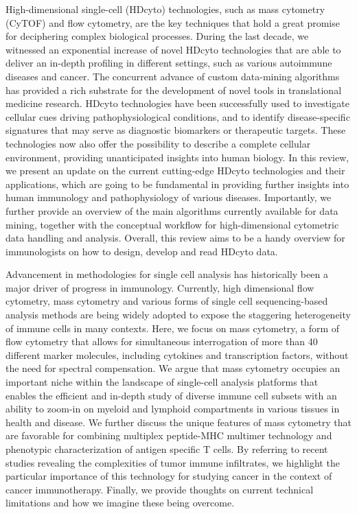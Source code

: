 \cite{galliEndOmicsHigh2019}
High-dimensional single-cell (HDcyto) technologies, such as mass cytometry
(CyTOF) and flow cytometry, are the key techniques that hold a great promise
for deciphering complex biological processes. During the last decade, we
witnessed an exponential increase of novel HDcyto technologies that are able to
deliver an in-depth profiling in different settings, such as various autoimmune
diseases and cancer. The concurrent advance of custom data-mining algorithms
has provided a rich substrate for the development of novel tools in
translational medicine research. HDcyto technologies have been successfully
used to investigate cellular cues driving pathophysiological conditions, and to
identify disease-specific signatures that may serve as diagnostic biomarkers or
therapeutic targets. These technologies now also offer the possibility to
describe a complete cellular environment, providing unanticipated insights into
human biology. In this review, we present an update on the current cutting-edge
HDcyto technologies and their applications, which are going to be fundamental
in providing further insights into human immunology and pathophysiology of
various diseases. Importantly, we further provide an overview of the main
algorithms currently available for data mining, together with the conceptual
workflow for high-dimensional cytometric data handling and analysis. Overall,
this review aims to be a handy overview for immunologists on how to design,
develop and read HDcyto data.

\cite{simoniMassCytometryPowerful2018}
Advancement in methodologies for single cell analysis has historically been a
major driver of progress in immunology. Currently, high dimensional flow
cytometry, mass cytometry and various forms of single cell sequencing-based
analysis methods are being widely adopted to expose the staggering
heterogeneity of immune cells in many contexts. Here, we focus on mass
cytometry, a form of flow cytometry that allows for simultaneous interrogation
of more than 40 different marker molecules, including cytokines and
transcription factors, without the need for spectral compensation. We argue
that mass cytometry occupies an important niche within the landscape of
single-cell analysis platforms that enables the efficient and in-depth study of
diverse immune cell subsets with an ability to zoom-in on myeloid and lymphoid
compartments in various tissues in health and disease. We further discuss the
unique features of mass cytometry that are favorable for combining multiplex
peptide-MHC multimer technology and phenotypic characterization of antigen
specific T cells. By referring to recent studies revealing the complexities of
tumor immune infiltrates, we highlight the particular importance of this
technology for studying cancer in the context of cancer immunotherapy. Finally,
we provide thoughts on current technical limitations and how we imagine these
being overcome.





